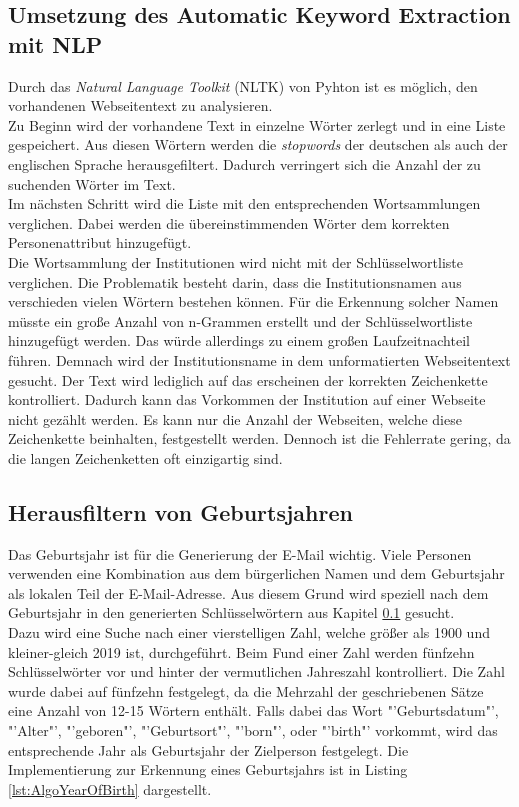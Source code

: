 	\subsection{Umsetzung des Automatic Keyword Extraction mit NLP}
		\label{subsec:AutomaticKeywordExtractionNLP}
		Durch das \textit{Natural Language Toolkit} (NLTK) von Pyhton ist es möglich, den vorhandenen Webseitentext zu analysieren.\\
		Zu Beginn wird der vorhandene Text in einzelne Wörter zerlegt und in eine Liste gespeichert. Aus diesen Wörtern werden die \textit{stopwords} der deutschen als auch der englischen Sprache herausgefiltert. Dadurch verringert sich die Anzahl der zu suchenden Wörter im Text. \\
		Im nächsten Schritt wird die Liste mit den entsprechenden Wortsammlungen verglichen. Dabei werden die übereinstimmenden Wörter dem korrekten Personenattribut hinzugefügt.\\
		Die Wortsammlung der Institutionen wird nicht mit der Schlüsselwortliste verglichen. Die Problematik besteht darin, dass die Institutionsnamen aus verschieden vielen Wörtern bestehen können. Für die Erkennung solcher Namen müsste ein große Anzahl von n-Grammen erstellt und der Schlüsselwortliste hinzugefügt werden. Das würde allerdings zu einem großen Laufzeitnachteil führen. Demnach wird der Institutionsname in dem unformatierten Webseitentext gesucht. Der Text wird lediglich auf das erscheinen der korrekten Zeichenkette kontrolliert. Dadurch kann das Vorkommen der Institution auf einer Webseite nicht gezählt werden. Es kann nur die Anzahl der Webseiten, welche diese Zeichenkette beinhalten, festgestellt werden. Dennoch ist die Fehlerrate gering, da die langen Zeichenketten oft einzigartig sind.
		

	\subsection{Herausfiltern von Geburtsjahren}
		Das Geburtsjahr ist für die Generierung der E-Mail wichtig. Viele Personen verwenden eine Kombination aus dem bürgerlichen Namen und dem Geburtsjahr als lokalen Teil der E-Mail-Adresse. Aus diesem Grund wird speziell nach dem Geburtsjahr in den generierten Schlüsselwörtern aus Kapitel \ref{subsec:AutomaticKeywordExtractionNLP} gesucht.\\
		Dazu wird eine Suche nach einer vierstelligen Zahl, welche größer als 1900 und kleiner-gleich 2019 ist, durchgeführt. Beim Fund einer Zahl werden  fünfzehn Schlüsselwörter vor und hinter der vermutlichen Jahreszahl kontrolliert. Die Zahl wurde dabei auf fünfzehn festgelegt, da die Mehrzahl der geschriebenen Sätze eine Anzahl von 12-15 Wörtern enthält. \cite{seibicke1969schreibt} Falls dabei das Wort "'Geburtsdatum"', "'Alter"', "'geboren"', "'Geburtsort"', "'born"', oder "'birth"' vorkommt, wird das entsprechende Jahr als Geburtsjahr der Zielperson festgelegt. Die Implementierung zur Erkennung eines Geburtsjahrs ist in Listing \ref{lst:AlgoYearOfBirth} dargestellt.\\
		
